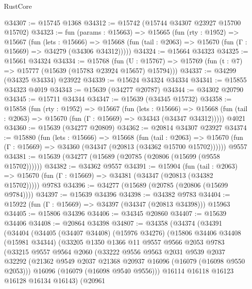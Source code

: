 \begin{lexlean}{RustCore}
\begin{coremodule}
@34307 := @15745 @1368
@34312 := @15742 (@15744 @34307 @23927 @15700 @15702)
@34323 := fun (params : @15663) =>
  @15665
    (fun (rty : @1952) =>
    @15667
      (fun (lets : @15666) =>
      @15668 (fun (tail : @2063) => @15670 (fun (Γ : @15669) => @34279 (@34306 @34312)))))
@34324 := @15664 @34323
@34325 := @15661 @34324
@34334 := @15768
    (fun (U : @15767) => @15769 (fun (t : @7) => @15777 (@15639 (@15783 @23924 @15657) @15794)))
@34337 := @34299 (@34325 @34334) @23922
@34339 := @15624 @34324 @34334
@34341 := @15855 @34323 @4019
@34343 := @15639 (@34277 @20787)
@34344 := @34302 @20790
@34345 := @15711 @34344
@34347 := @15639 (@34345 @15732)
@34358 := @15858
    (fun (rty : @1952) =>
    @15667
      (fun (lets : @15666) =>
      @15668 (fun (tail : @2063) => @15670 (fun (Γ : @15669) => @34343 (@34347 @34312)))))
    @4021
@34360 := @15639 (@34277 @20809)
@34362 := @20814 @34307 @23927
@34374 := @15880
    (fun (lets : @15666) =>
    @15668
      (fun (tail : @2063) =>
      @15670 (fun (Γ : @15669) => @34360 (@34347 (@20813 (@34362 @15700 @15702))))))
    @9557
@34381 := @15639 (@34277 (@15689 (@20785 (@20806 (@15699 (@9558 @15702))))))
@34382 := @34362 @9557
@34391 := @15904
    (fun (tail : @2063) => @15670 (fun (Γ : @15669) => @34381 (@34347 (@20813 (@34382 @15702)))))
    @9783
@34396 := @34277 (@15689 (@20785 (@20806 (@15699 @9784))))
@34397 := @15639 @34396
@34398 := @34382 @9783
@34404 := @15922 (fun (Γ : @15669) => @34397 (@34347 (@20813 @34398))) @15963
@34405 := @15806 @34396
@34406 := @34345 @20860
@34407 := @15639 @34406
@34408 := @20864 @34398
@34807 := @34358
    (@34374
      (@34391
        (@34404
          (@34405
            (@34407 @34408)
            (@15976 @34276)
            (@15806
              @34406
              @34408
              (@15981 @34344)
              (@33205
                @1350
                @1366
                @11
                @9557
                @9566
                @2053
                @9783
                (@33215
                  @9557
                  @9564
                  @2060
                  (@33222
                    @9556
                    @9563
                    @2031
                    @9539
                    @2037
                    @32292
                    (@21362 @9549 @2037 @21368 @20937 @16096 (@16079 (@16098 @9550 @2053)))
                    @16096
                    (@16079 (@16098 @9540 @9556)))
                  @16114
                  @16118
                  @16123
                  @16128
                  @16134
                  @16143)
                (@20961

\end{coremodule}
\end{lexlean}
